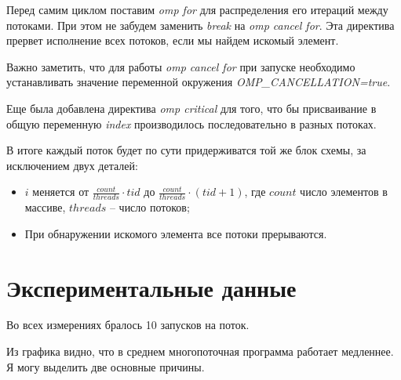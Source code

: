 \documentclass[a4paper, 12pt]{article}
\begin{document}
Перед самим циклом поставим \textit{omp for} для распределения его итераций между потоками. При этом не забудем заменить \textit{break} на \textit{omp cancel for}. Эта директива прервет исполнение всех потоков, если мы найдем искомый элемент.

Важно заметить, что для работы \textit{omp cancel for} при запуске необходимо устанавливать значение переменной окружения \textit{OMP\_CANCELLATION=true}.

Еще была добавлена директива \textit{omp critical} для того, что бы присваивание в общую переменную \textit{index} производилось последовательно в разных потоках.

В итоге каждый поток будет по сути придерживатся той же блок схемы, за исключением двух деталей:
\begin{itemize}
 \item $i$ меняется от $\frac{count}{threads} \cdot tid$ до $\frac{count}{threads} \cdot (tid + 1)$, где $count$ число элементов в массиве, $threads$ -- число потоков;
 \item При обнаружении искомого элемента все потоки прерываются.
\end{itemize}



\section{Экспериментальные данные}

Во всех измерениях бралось 10 запусков на поток.

\vspace{0.3cm}


\vspace{0.5cm}

Из графика видно, что в среднем многопоточная программа работает медленнее. Я могу выделить две основные причины.
\end{document}
